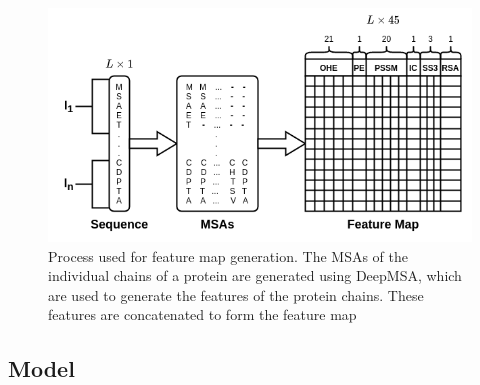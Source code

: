 \documentclass[journal=jacsat,manuscript=article]{achemso}
\begin{document}
\begin{figure}
    \centering
    \noindent\includegraphics[scale=0.6]{feature_map}
    \caption{\centering Process used for feature map generation. The MSAs of the individual chains of a protein are generated using DeepMSA, which are used to generate the features of the protein chains. These features are concatenated to form the feature map}
    \label{fig:feature_map}
\end{figure}





\subsection{Model}
\end{document}
